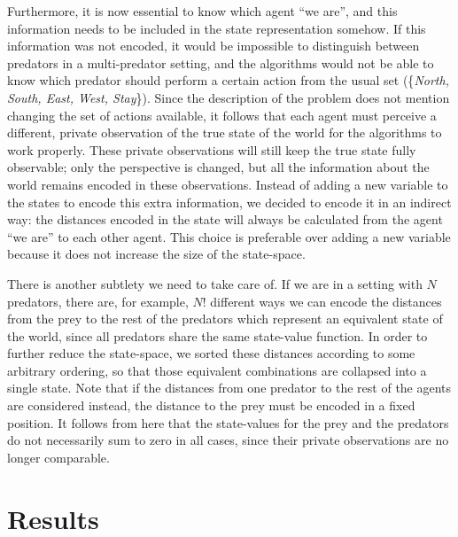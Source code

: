 \documentclass[a4paper,12pt]{article}
\begin{document}
Furthermore, it is now essential to know which agent ``we are'', and this information needs to be included in the state representation somehow. If this information was not encoded, it would be impossible to distinguish between predators in a multi-predator setting, and the algorithms would not be able to know which predator should perform a certain action from the usual set (\{\textit{North, South, East, West, Stay}\}). Since the description of the problem does not mention changing the set of actions available, it follows that each agent must perceive a different, private observation of the true state of the world for the algorithms to work properly. These private observations will still keep the true state fully observable; only the perspective is changed, but all the information about the world remains encoded in these observations. Instead of adding a new variable to the states to encode this extra information, we decided to encode it in an indirect way: the distances encoded in the state will always be calculated from the agent ``we are'' to each other agent. This choice is preferable over adding a new variable because it does not increase the size of the state-space.

There is another subtlety we need to take care of. If we are in a setting with $N$ predators, there are, for example, $N!$ different ways we can encode the distances from the prey to the rest of the predators which represent an equivalent state of the world, since all predators share the same state-value function. In order to further reduce the state-space, we sorted these distances according to some arbitrary ordering, so that those equivalent combinations are collapsed into a single state. Note that if the distances from one predator to the rest of the agents are considered instead, the distance to the prey must be encoded in a fixed position. It follows from here that the state-values for the prey and the predators do not necessarily sum to zero in all cases, since their private observations are no longer comparable.

\newpage

\section{Results}
\end{document}
